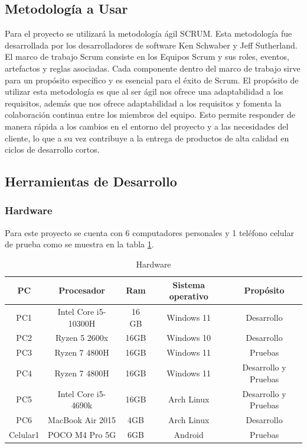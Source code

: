 \documentclass[letterpaper, 10pt]{article}
\begin{document}
\subsection{Metodología a Usar}
Para el proyecto se utilizará la metodología ágil SCRUM\cite{1}. Esta metodología fue desarrollada por los desarrolladores de software Ken Schwaber y Jeff Sutherland. El marco de trabajo Scrum consiste en los Equipos Scrum y sus roles, eventos, artefactos y reglas asociadas\cite{2}. Cada componente dentro del marco de trabajo sirve para un propósito específico y es esencial para el éxito de Scrum. El propósito de utilizar esta metodología es que al ser ágil nos ofrece una adaptabilidad a los requisitos, además que nos ofrece adaptabilidad a los requisitos y fomenta la colaboración continua entre los miembros del equipo. Esto permite responder de manera rápida a los cambios en el entorno del proyecto y a las necesidades del cliente, lo que a su vez contribuye a la entrega de productos de alta calidad en ciclos de desarrollo cortos.
\subsection{Herramientas de Desarrollo}
\subsubsection{Hardware}
Para este proyecto se cuenta con 6 computadores personales y 1 teléfono celular de prueba como se muestra en la tabla 
\ref{table:1}.
\begin{table}[H]
    \centering
    \caption{Hardware}
	\vspace{0.2cm}
    \begin{tabular}{|c|c|c|c|c|} \hline
        \textbf{PC} & \textbf{Procesador} & \textbf{Ram} & \textbf{Sistema operativo} & \textbf{Propósito}  \\ \hline
         PC1 & Intel Core i5-10300H       & 16 GB        & Windows 11 & Desarrollo \\\hline
         PC2 & Ryzen 5 2600x       &  16GB      & Windows 10 & Desarrollo\\\hline
         PC3 & Ryzen 7 4800H       &  16GB      & Windows 11  & Pruebas\\\hline
         PC4 & Ryzen 7 4800H       &  16GB      & Windows 11 & Desarrollo y Pruebas\\\hline
		 PC5 & Intel Core i5-4690k &  16GB		& Arch Linux & Desarrollo y Pruebas\\\hline
		 PC6 & MacBook Air 2015	   &  4GB		& Arch Linux & Desarrollo\\\hline
		 Celular1 &	POCO M4 Pro 5G &  6GB		& Android	 & Pruebas\\\hline
    \end{tabular}
    
    \label{table:1}
\end{table}
\newpage
\end{document}
